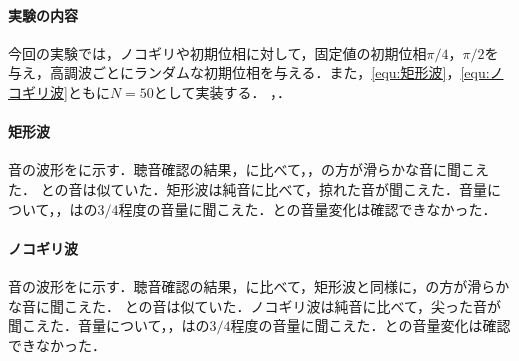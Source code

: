 \paragraph{実験の内容}今回の実験では，ノコギリや初期位相に対して，固定値の初期位相\(\pi/4\)，\(\pi/2\)を与え，高調波ごとにランダムな初期位相を与える．また，\eqref{equ:矩形波}，\eqref{equ:ノコギリ波}ともに\(N=50\)として実装する．
\scall{}，．
\result
\paragraph{矩形波}
音の波形をに示す．聴音確認の結果，に比べて，，の方が滑らかな音に聞こえた．
との音は似ていた．矩形波は純音に比べて，掠れた音が聞こえた．音量について，，はの\(3/4\)程度の音量に聞こえた．との音量変化は確認できなかった．
\paragraph{ノコギリ波}
音の波形をに示す．聴音確認の結果，に比べて，矩形波と同様に，の方が滑らかな音に聞こえた．
との音は似ていた．ノコギリ波は純音に比べて，尖った音が聞こえた．音量について，，はの\(3/4\)程度の音量に聞こえた．との音量変化は確認できなかった．
